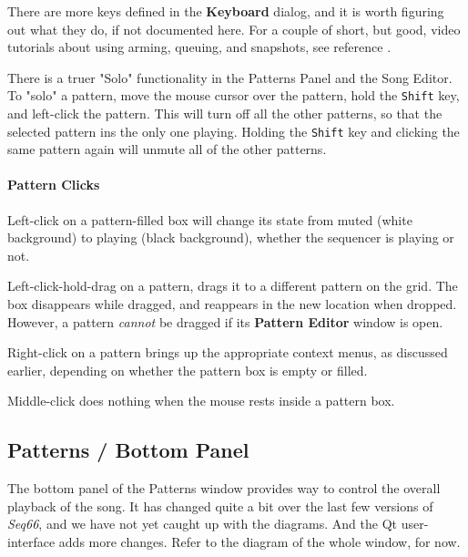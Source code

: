    There are more keys defined in the \textbf{Keyboard} dialog, and it is
   worth figuring out what they do, if not documented here.
   For a couple of short, but good, video tutorials about using arming,
   queuing, and snapshots, see reference \cite{wootangent1}.

   There is a truer "Solo" functionality in the Patterns
   Panel and the Song Editor.  To "solo" a pattern, move the mouse cursor
   over the pattern, hold the \texttt{Shift} key, and left-click the pattern.
   This will turn off all the other patterns, so that the selected pattern ins
   the only one playing.  Holding the \texttt{Shift} key and clicking the same
   pattern again will unmute all of the other patterns.

\paragraph{Pattern Clicks}
\label{paragraph:patterns_pattern_Clicks}

   Left-click on a pattern-filled box will change its state
   from muted (white background) to playing (black background), whether
   the sequencer is playing or not.

   Left-click-hold-drag on a pattern, drags it to a different
   pattern on the grid.
   The box disappears while dragged, and reappears in the new location when
   dropped.  However, a pattern \textsl{cannot} be dragged if its
   \textbf{Pattern Editor} window is open.

   Right-click on a pattern brings up the appropriate context menus, as
   discussed earlier, depending on whether the pattern box is empty or
   filled.

   Middle-click does nothing when the mouse rests inside a pattern box.

\subsection{Patterns / Bottom Panel}
\label{subsec:patterns_panel_bottom}

   The bottom panel of the Patterns window provides way to control the
   overall playback of the song.  It has changed quite a bit over the last few
   versions of \textsl{Seq66}, and we have not yet caught up with the
   diagrams. And the Qt user-interface adds more changes.
   Refer to the diagram of the whole window, for now.

